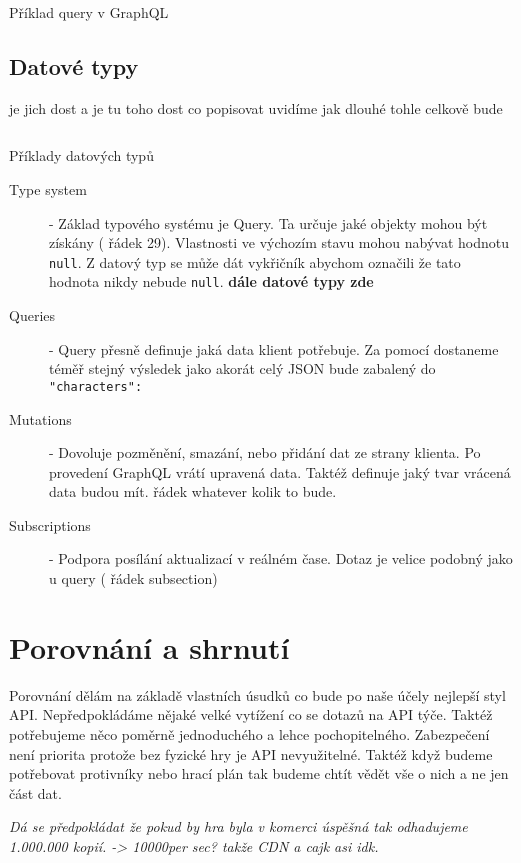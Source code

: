 \begin{listing}[ht!]
    \inputminted[]{graphql}{resources/code//standards/playerquery.gql}
    \caption{Příklad query v GraphQL}
    \label{code:gql_querry}
\end{listing}

\subsection{Datové typy}
je jich dost a je tu toho dost co popisovat
uvidíme jak dlouhé tohle celkově bude


\begin{listing}[ht]
    \inputminted[]{graphql}{resources/code/standards/types.example.gql}
    \caption{Příklady datových typů}
    \label{code:gql_datatypes}
\end{listing}

\begin{description}
    \item[Type system] - Základ typového systému je Query. Ta určuje jaké objekty mohou být získány ( řádek 29). Vlastnosti ve výchozím stavu mohou nabývat hodnotu \texttt{null}. Z datový typ se může dát vykřičník abychom označili že tato hodnota nikdy nebude \texttt{null}. \textbf{dále datové typy zde}
    \item[Queries] - Query přesně definuje jaká data klient potřebuje. Za pomocí  dostaneme téměř stejný výsledek jako  akorát celý JSON bude zabalený do \texttt{"characters": {}}
    \item[Mutations] - Dovoluje pozměnění, smazání, nebo přidání dat ze strany klienta. Po provedení GraphQL vrátí upravená data. Taktéž definuje jaký tvar vrácená data budou mít.  řádek whatever kolik to bude.
    \item[Subscriptions] - Podpora posílání aktualizací v reálném čase. Dotaz je velice podobný jako u query ( řádek subsection)
\end{description}

\section{Porovnání a shrnutí} %

Porovnání dělám na základě vlastních úsudků co bude po naše účely nejlepší styl API. Nepředpokládáme nějaké velké vytížení co se dotazů na API týče. Taktéž potřebujeme něco poměrně jednoduchého a lehce pochopitelného. Zabezpečení není priorita protože bez fyzické hry je API nevyužitelné. Taktéž když budeme potřebovat protivníky nebo hrací plán tak budeme chtít vědět vše o nich a ne jen část dat.

\textit{Dá se předpokládat že pokud by hra byla v komerci úspěšná tak odhadujeme 1.000.000 kopií. -> 10000per sec? takže CDN a cajk asi idk.} %


\endinput
